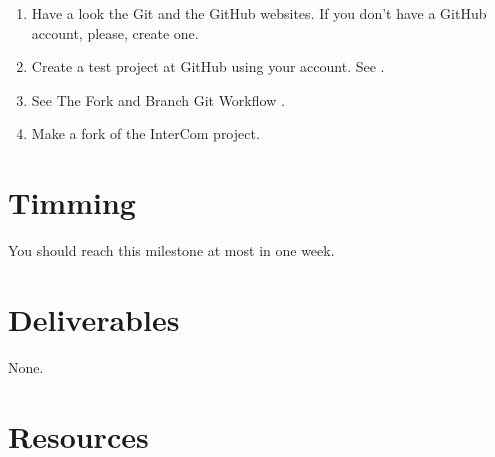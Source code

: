 \begin{enumerate}
\item Have a look the Git \cite{Git, Git-book} and the GitHub
  \cite{GitHub} websites. If you don't have a GitHub account, please,
  create one.
\item Create a test project at GitHub using your account. See
  \cite{GitHub-HW}.
\item See The Fork and Branch Git Workflow \cite{Git-workflow}.
\item Make a fork of the InterCom \cite{intercom} project. 
\end{enumerate}

\section{Timming}

You should reach this milestone at most in one week.

\section{Deliverables}

None.

\section{Resources}


